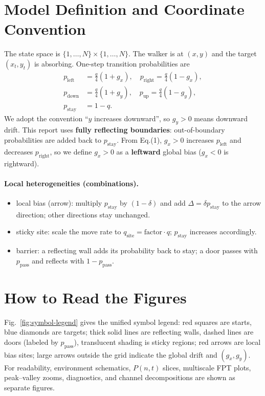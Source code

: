 \documentclass[11pt]{article}
\begin{document}
\section{Model Definition and Coordinate Convention}
The state space is $\{1,\dots,N\}\times\{1,\dots,N\}$. The walker is at $(x,y)$ and the target $(x_t,y_t)$ is absorbing. One-step transition probabilities are
\begin{align}
  p_{\text{left}} &= \frac{q}{4}(1+g_x),\quad p_{\text{right}} = \frac{q}{4}(1-g_x),\\
  p_{\text{down}} &= \frac{q}{4}(1+g_y),\quad p_{\text{up}} = \frac{q}{4}(1-g_y),\\
  p_{\text{stay}} &= 1-q.
\end{align}
We adopt the convention ``$y$ increases downward'', so $g_y>0$ means downward drift. This report uses \textbf{fully reflecting boundaries}: out-of-boundary probabilities are added back to $p_{\text{stay}}$.
\noindent From Eq.(1), $g_x>0$ increases $p_{\text{left}}$ and decreases $p_{\text{right}}$, so we define $g_x>0$ as a \textbf{leftward} global bias ($g_x<0$ is rightward).

\paragraph{Local heterogeneities (combinations).}
\begin{itemize}
  \item local bias (arrow): multiply $p_{\text{stay}}$ by $(1-\delta)$ and add $\Delta=\delta p_{\text{stay}}$ to the arrow direction; other directions stay unchanged.
  \item sticky site: scale the move rate to $q_{\text{site}}=\text{factor}\cdot q$; $p_{\text{stay}}$ increases accordingly.
  \item barrier: a reflecting wall adds its probability back to stay; a door passes with $p_{\text{pass}}$ and reflects with $1-p_{\text{pass}}$.
\end{itemize}

\section{How to Read the Figures}
Fig.~\ref{fig:symbol-legend} gives the unified symbol legend: red squares are starts, blue diamonds are targets; thick solid lines are reflecting walls, dashed lines are doors (labeled by $p_{\text{pass}}$), translucent shading is sticky regions; red arrows are local bias sites; large arrows outside the grid indicate the global drift and $(g_x,g_y)$. For readability, environment schematics, $P(n,t)$ slices, multiscale FPT plots, peak--valley zooms, diagnostics, and channel decompositions are shown as separate figures.
\end{document}
